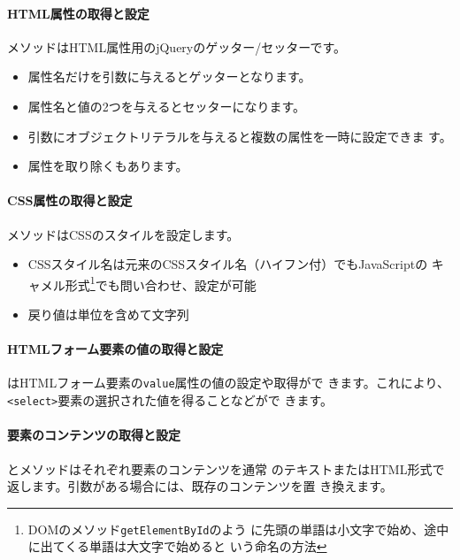 \paragraph{HTML属性の取得と設定}
メソッドはHTML属性用のjQueryのゲッター/セッターです。
\begin{itemize}
 \item 属性名だけを引数に与えるとゲッターとなります。
 \item 属性名と値の2つを与えるとセッターになります。
 \item 引数にオブジェクトリテラルを与えると複数の属性を一時に設定できま
			 す。
 \item 属性を取り除くもあります。
\end{itemize}
\paragraph{CSS属性の取得と設定}
メソッドはCSSのスタイルを設定します。
\begin{itemize}
 \item CSSスタイル名は元来のCSSスタイル名（ハイフン付）でもJavaScriptの
       キャメル形式\footnote{DOMのメソッド\texttt{getElementById}のよう
       に先頭の単語は小文字で始め、途中に出てくる単語は大文字で始めると
       いう命名の方法}でも問い合わせ、設定が可能
 \item 戻り値は単位を含めて文字列
\end{itemize}
\paragraph{HTMLフォーム要素の値の取得と設定}
はHTMLフォーム要素の\texttt{value}属性の値の設定や取得がで
きます。これにより、\texttt{<select>}要素の選択された値を得ることなどがで
きます。
\paragraph{要素のコンテンツの取得と設定}
とメソッドはそれぞれ要素のコンテンツを通常
のテキストまたはHTML形式で返します。引数がある場合には、既存のコンテンツを置
き換えます。
